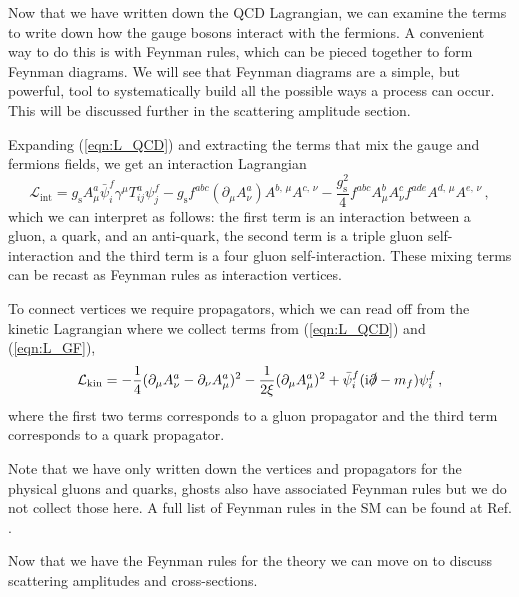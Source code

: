 \documentclass[main.tex]{subfiles}
\begin{document}
    Now that we have written down the QCD Lagrangian,
    we can examine the terms to write down how the
    gauge bosons interact with the fermions. A convenient
    way to do this is with Feynman rules, which can be
    pieced together to form Feynman diagrams. We will see
    that Feynman diagrams are a simple, but powerful, tool
    to systematically build all the possible ways a process
    can occur. This will be discussed further in the
    scattering amplitude section.

    Expanding (\ref{eqn:L_QCD}) and extracting the terms
    that mix the gauge and fermions fields, we get an interaction Lagrangian
    \begin{equation}\label{L_int}
        \mathcal{L}_{\mathrm{int}} = g_{\mathrm{s}}A^{a}_{\mu}\bar{\psi}_{i}^{f}\gamma^{\mu}T^{a}_{ij}\psi_{j}^{f}-g_{\mathrm{s}}f^{abc}(\partial_{\mu}A^{a}_{\nu})A^{b,\,\mu}A^{c,\,\nu} -\dfrac{g_{\mathrm{s}}^{2}}{4}f^{abc}A^{b}_{\mu}A^{c}_{\nu}f^{ade}A^{d,\,\mu}A^{e,\,\nu} \, ,
    \end{equation}
    which we can interpret as follows: the first term
    is an interaction between a gluon, a quark, and an
    anti-quark, the second term is a triple gluon
    self-interaction and the third term is a four gluon
    self-interaction. These mixing terms can be recast
    as Feynman rules as interaction vertices.

    To connect vertices we require propagators, which
    we can read off from the kinetic Lagrangian where
    we collect terms from (\ref{eqn:L_QCD}) and (\ref{eqn:L_GF}), 
    \begin{equation}\label{L_kin}
        \mathcal{L}_{\mathrm{kin}} = -\dfrac{1}{4}(\partial_{\mu}A^{a}_{\nu}-\partial_{\nu}A^{a}_{\mu})^{2} - \dfrac{1}{2\xi}(\partial_{\mu}A^{a}_{\mu})^{2} + \bar{\psi}_{i}^{f}(\mathrm{i}\slashed{\partial}-m_{f})\psi_{i}^{f} \, ,
    \end{equation}
    where the first two terms corresponds to a gluon
    propagator and the third term corresponds to
    a quark propagator.

    Note that we have only written down the vertices
    and propagators for the physical gluons and quarks,
    ghosts also have associated Feynman rules but we do
    not collect those here. A full list of Feynman rules
    in the SM can be found at Ref. \cite{Romao:2012pq}.

    Now that we have the Feynman rules for the theory
    we can move on to discuss scattering amplitudes
    and cross-sections.
\end{document}
